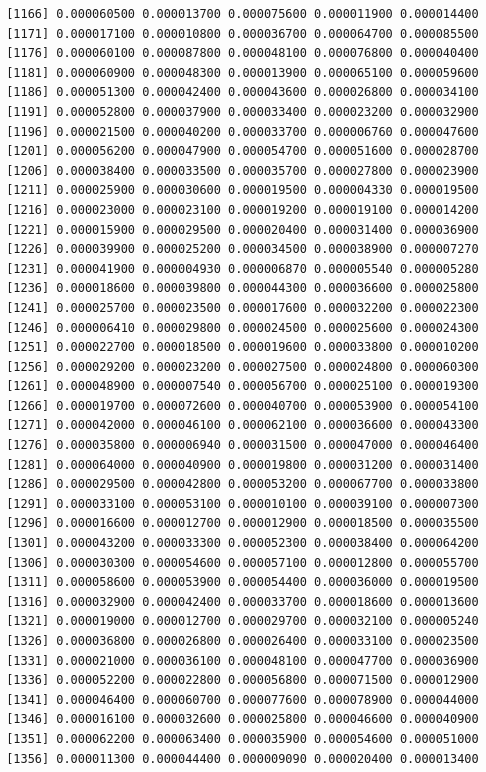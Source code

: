 \documentclass[]{article}
\begin{document}
\begin{verbatim}
 [1166] 0.000060500 0.000013700 0.000075600 0.000011900 0.000014400
 [1171] 0.000017100 0.000010800 0.000036700 0.000064700 0.000085500
 [1176] 0.000060100 0.000087800 0.000048100 0.000076800 0.000040400
 [1181] 0.000060900 0.000048300 0.000013900 0.000065100 0.000059600
 [1186] 0.000051300 0.000042400 0.000043600 0.000026800 0.000034100
 [1191] 0.000052800 0.000037900 0.000033400 0.000023200 0.000032900
 [1196] 0.000021500 0.000040200 0.000033700 0.000006760 0.000047600
 [1201] 0.000056200 0.000047900 0.000054700 0.000051600 0.000028700
 [1206] 0.000038400 0.000033500 0.000035700 0.000027800 0.000023900
 [1211] 0.000025900 0.000030600 0.000019500 0.000004330 0.000019500
 [1216] 0.000023000 0.000023100 0.000019200 0.000019100 0.000014200
 [1221] 0.000015900 0.000029500 0.000020400 0.000031400 0.000036900
 [1226] 0.000039900 0.000025200 0.000034500 0.000038900 0.000007270
 [1231] 0.000041900 0.000004930 0.000006870 0.000005540 0.000005280
 [1236] 0.000018600 0.000039800 0.000044300 0.000036600 0.000025800
 [1241] 0.000025700 0.000023500 0.000017600 0.000032200 0.000022300
 [1246] 0.000006410 0.000029800 0.000024500 0.000025600 0.000024300
 [1251] 0.000022700 0.000018500 0.000019600 0.000033800 0.000010200
 [1256] 0.000029200 0.000023200 0.000027500 0.000024800 0.000060300
 [1261] 0.000048900 0.000007540 0.000056700 0.000025100 0.000019300
 [1266] 0.000019700 0.000072600 0.000040700 0.000053900 0.000054100
 [1271] 0.000042000 0.000046100 0.000062100 0.000036600 0.000043300
 [1276] 0.000035800 0.000006940 0.000031500 0.000047000 0.000046400
 [1281] 0.000064000 0.000040900 0.000019800 0.000031200 0.000031400
 [1286] 0.000029500 0.000042800 0.000053200 0.000067700 0.000033800
 [1291] 0.000033100 0.000053100 0.000010100 0.000039100 0.000007300
 [1296] 0.000016600 0.000012700 0.000012900 0.000018500 0.000035500
 [1301] 0.000043200 0.000033300 0.000052300 0.000038400 0.000064200
 [1306] 0.000030300 0.000054600 0.000057100 0.000012800 0.000055700
 [1311] 0.000058600 0.000053900 0.000054400 0.000036000 0.000019500
 [1316] 0.000032900 0.000042400 0.000033700 0.000018600 0.000013600
 [1321] 0.000019000 0.000012700 0.000029700 0.000032100 0.000005240
 [1326] 0.000036800 0.000026800 0.000026400 0.000033100 0.000023500
 [1331] 0.000021000 0.000036100 0.000048100 0.000047700 0.000036900
 [1336] 0.000052200 0.000022800 0.000056800 0.000071500 0.000012900
 [1341] 0.000046400 0.000060700 0.000077600 0.000078900 0.000044000
 [1346] 0.000016100 0.000032600 0.000025800 0.000046600 0.000040900
 [1351] 0.000062200 0.000063400 0.000035900 0.000054600 0.000051000
 [1356] 0.000011300 0.000044400 0.000009090 0.000020400 0.000013400

\end{verbatim}
\end{document}
